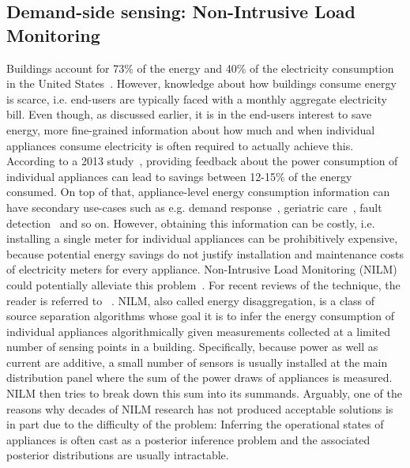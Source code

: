 \documentclass[11pt]{cmuthesis} %
\begin{document}
\subsection{Demand-side sensing: Non-Intrusive Load Monitoring} 
Buildings account for 73\% of the energy and 40\% of the electricity consumption in the United States~\cite{li2014review}. However, knowledge about how buildings consume energy is scarce, i.e. end-users are typically faced with a monthly aggregate electricity bill. Even though, as discussed earlier, it is in the end-users interest to save energy, more fine-grained information about how much and when individual appliances consume electricity is often required to actually achieve this. According to a 2013 study~\cite{armel2013disaggregation}, providing feedback about the power consumption of individual appliances can lead to savings between 12-15\% of the energy consumed. On top of that, appliance-level energy consumption information can have secondary use-cases such as e.g. demand response~\cite{he2013incorporating}, geriatric care~\cite{alcala2015detecting}, fault detection~\cite{denucci2005diagnostic} and so on. However, obtaining this information can be costly, i.e. installing a single meter for individual appliances can be prohibitively expensive, because potential energy savings do not justify installation and maintenance costs of electricity meters for every appliance. Non-Intrusive Load Monitoring (NILM) could potentially alleviate this problem~\cite{hart1992nonintrusive}. For recent reviews of the technique, the reader is referred to ~\cite{zoha2012non,zeifman2011nonintrusive,faustine2017survey}. NILM, also called energy disaggregation, is a class of source separation algorithms whose goal it is to infer the energy consumption of individual appliances algorithmically given measurements collected at a limited number of sensing points in a building. Specifically, because power as well as current are additive, a small number of sensors is usually installed at the main distribution panel where the sum of the power draws of appliances is measured. NILM then tries to break down this sum into its summands. Arguably, one of the reasons why decades of NILM research has not produced acceptable solutions is in part due to the difficulty of the problem: Inferring the operational states of appliances is often cast as a posterior inference problem and the associated posterior distributions are usually intractable.
\end{document}
